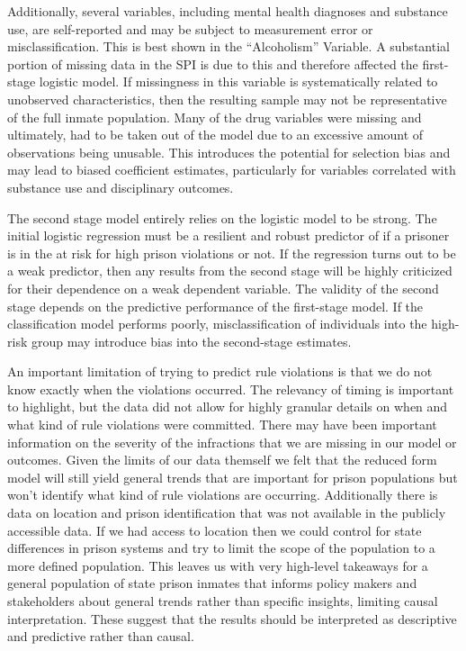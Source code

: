 \documentclass[
]{article}
\begin{document}
Additionally, several variables, including mental health diagnoses and
substance use, are self-reported and may be subject to measurement error
or misclassification. This is best shown in the ``Alcoholism'' Variable.
A substantial portion of missing data in the SPI is due to this and
therefore affected the first-stage logistic model. If missingness in
this variable is systematically related to unobserved characteristics,
then the resulting sample may not be representative of the full inmate
population. Many of the drug variables were missing and ultimately, had
to be taken out of the model due to an excessive amount of observations
being unusable. This introduces the potential for selection bias and may
lead to biased coefficient estimates, particularly for variables
correlated with substance use and disciplinary outcomes.

The second stage model entirely relies on the logistic model to be
strong. The initial logistic regression must be a resilient and robust
predictor of if a prisoner is in the at risk for high prison violations
or not. If the regression turns out to be a weak predictor, then any
results from the second stage will be highly criticized for their
dependence on a weak dependent variable. The validity of the second
stage depends on the predictive performance of the first-stage model. If
the classification model performs poorly, misclassification of
individuals into the high-risk group may introduce bias into the
second-stage estimates.

An important limitation of trying to predict rule violations is that we
do not know exactly when the violations occurred. The relevancy of
timing is important to highlight, but the data did not allow for highly
granular details on when and what kind of rule violations were
committed. There may have been important information on the severity of
the infractions that we are missing in our model or outcomes. Given the
limits of our data themself we felt that the reduced form model will
still yield general trends that are important for prison populations but
won't identify what kind of rule violations are occurring. Additionally
there is data on location and prison identification that was not
available in the publicly accessible data. If we had access to location
then we could control for state differences in prison systems and try to
limit the scope of the population to a more defined population. This
leaves us with very high-level takeaways for a general population of
state prison inmates that informs policy makers and stakeholders about
general trends rather than specific insights, limiting causal
interpretation. These suggest that the results should be interpreted as
descriptive and predictive rather than causal.
\end{document}
